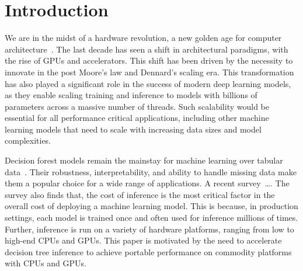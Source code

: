 \section{Introduction}
\label{sec:intro}
We are in the midst of a hardware revolution, a new golden age for computer architecture~\cite{GoldenAge}. The last 
decade has seen a shift in architectural paradigms, with the rise of GPUs and accelerators. This shift has been driven
by the necessity to innovate in the post Moore's law and Dennard's scaling era. This transformation has also played 
a significant role in the success of modern deep learning models, as they enable scaling 
training and inference to models with billions of parameters across a massive number of threads. 
Such scalability would be essential for all performance critical applications, including
other machine learning models that need to scale with increasing data sizes and model complexities. 

Decision forest models remain the mainstay for machine learning over tabular data~\cite{DLNotAllYouNeed,TreebasedOutperformDL}. 
Their robustness, interpretability, and ability to handle missing data make them a popular choice for a wide range of applications. 
A recent survey~\cite{kaggle}\dots. 
The survey also finds that, the cost of inference is the most critical factor in the overall cost of deploying a machine learning model.
This is because, in production settings, each model is trained once and often used for inference millions of times. 
Further, inference is run on a variety of hardware platforms, ranging from low to high-end CPUs and GPUs. 
This paper is motivated by the need to accelerate decision tree inference to achieve portable performance on 
commodity platforms with CPUs and GPUs. 

